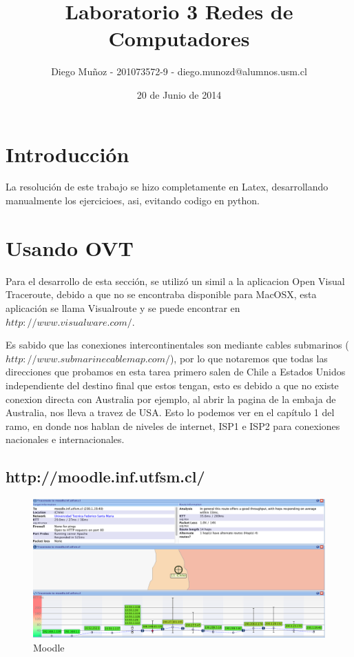 \documentclass[a4papaer]{article}
\begin{document}
 
\title{Laboratorio 3 Redes de Computadores}
\author{Diego Muñoz - 201073572-9 - diego.munozd@alumnos.usm.cl}
\date{20 de Junio de 2014}
\maketitle
 
\section{Introducción}
 
La resolución de este trabajo se hizo completamente en Latex, desarrollando manualmente los ejercicioes, asi, evitando codigo en python.
 
\section{Usando OVT}
 
Para el desarrollo de esta sección, se utilizó un simil a la aplicacion Open Visual Traceroute, debido a que no se encontraba disponible para MacOSX, esta aplicación se llama Visualroute y se puede encontrar en $http://www.visualware.com/$.

Es sabido que las conexiones intercontinentales son mediante cables submarinos ($http://www.submarinecablemap.com/$), por lo que notaremos que todas las direcciones que probamos en esta tarea primero salen de Chile a Estados Unidos independiente del destino final que estos tengan, esto es debido a que no existe conexion directa con Australia por ejemplo, al abrir la pagina de la embaja de Australia, nos lleva a travez de USA. Esto lo podemos ver en el capítulo 1 del ramo, en donde nos hablan de niveles de internet, ISP1 e ISP2 para conexiones nacionales e internacionales.

\subsection{http://moodle.inf.utfsm.cl/}

\begin{figure}[h]
  \centering
    \includegraphics[width=1\textwidth]{ss1}
  \caption{Moodle}
  \label{fig:Trace Route de http://moodle.inf.utfsm.cl/}
\end{figure}
\end{document}
